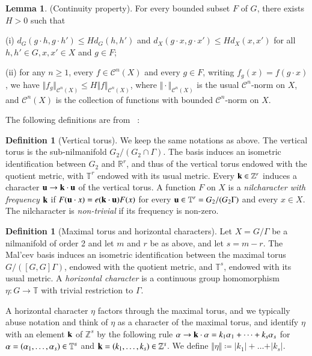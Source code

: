 \documentclass[12pt,amstex]{amsart}
\theoremstyle{definition}
\newtheorem{lem}[thm]{Lemma}
\newtheorem{defn}[thm]{Definition}
\def \A {\alpha}
\begin{document}
\begin{lem}\label{cts}(Continuity property).
  For every bounded subset $F$ of $G$, there exists $H>0$ such that

  (i) $d_{G}(g\cdot h,g\cdot h')\leq Hd_{G}(h,h')$ and $d_{X}(g\cdot x,g\cdot x')\leq Hd_{X}(x,x')$ for all $h,h'\in G, x,x'\in X$ and $g\in F$;

  (ii) for any $n\geq 1$, every $f\in\mathcal{C}^{n}(X)$ and every $g\in F$, writing $f_{g}(x)=f(g\cdot x)$, we have $\Vert f_{g}\Vert_{\mathcal{C}^{n}(X)}\leq H\Vert f\Vert_{\mathcal{C}^{n}(X)}$, where $\Vert \cdot\Vert_{\mathcal{C}^{n}(X)}$ is the usual $\mathcal{C}^{n}$-norm on $X$, and $\mathcal{C}^{n}(X)$ is the collection of functions with bounded $\mathcal{C}^{n}$-norm on $X$.
\end{lem}

The following definitions are from ~\cite{GT}:

\begin{defn}[Vertical torus] We keep the same notations as above. The vertical torus is the sub-nilmanifold $G_{2}/(G_{2}\cap\Gamma)$.
The basis induces an isometric identification between $G_{2}$ and $\mathbb{R}^{r}$, and thus of the vertical torus endowed with the quotient metric,
with $\mathbb{T}^{r}$ endowed with its usual metric. Every $\bold{k}\in\mathbb{Z}^{r}$ induces a character $\bold{u}\rightarrow\bold{k}\cdot\bold{u}$ of
the vertical torus. A function $F$ on $X$ is a \emph{nilcharacter with frequency $\bold{k}$} if $F(\bold{u}\cdot x)=e(\bold{k}\cdot\bold{u})F(x)$ for every
$\bold{u}\in\mathbb{T}^{r}=G_{2}/(G_{2}\Gamma)$ and every $x\in X$. The nilcharacter is \emph{non-trivial} if its frequency is non-zero.
\end{defn}
\begin{defn}[Maximal torus and horizontal characters] Let $X=G/\Gamma$ be a nilmanifold of order 2 and let $m$ and $r$ be as above, and let $s=m-r$. The Mal'cev basis induces an isometric identification between the maximal torus $G/([G,G]\Gamma)$, endowed with the quotient metric, and $\mathbb{T}^{s}$, endowed with its usual metric. A \emph{horizontal character} is a continuous group homomorphism $\eta\colon G\rightarrow\mathbb{T}$ with trivial
restriction to $\Gamma$.
\end{defn}
A horizontal character $\eta$
factors through the maximal torus, and we typically abuse notation
 and think of $\eta$ as a
character of the maximal torus, and identify $\eta$ with an element
 $\bold{k}$ of $\mathbb{Z}^{s}$ by the following
rule $\bold{\A}\rightarrow\bold{k}\cdot\bold{\A}=k_{1}\A_{1}+\dots+k_{s}\A_{s}$
for $\bold{\A}=(\A_{1},\dots,\A_{s})\in\mathbb{T}^{s}$ and
$\bold{k}=(k_{1},\dots,k_{s})\in\mathbb{Z}^{s}$.
We define $\Vert\eta\Vert\coloneqq\vert k_{1}\vert+\dots+\vert k_{s}\vert$.
\end{document}
